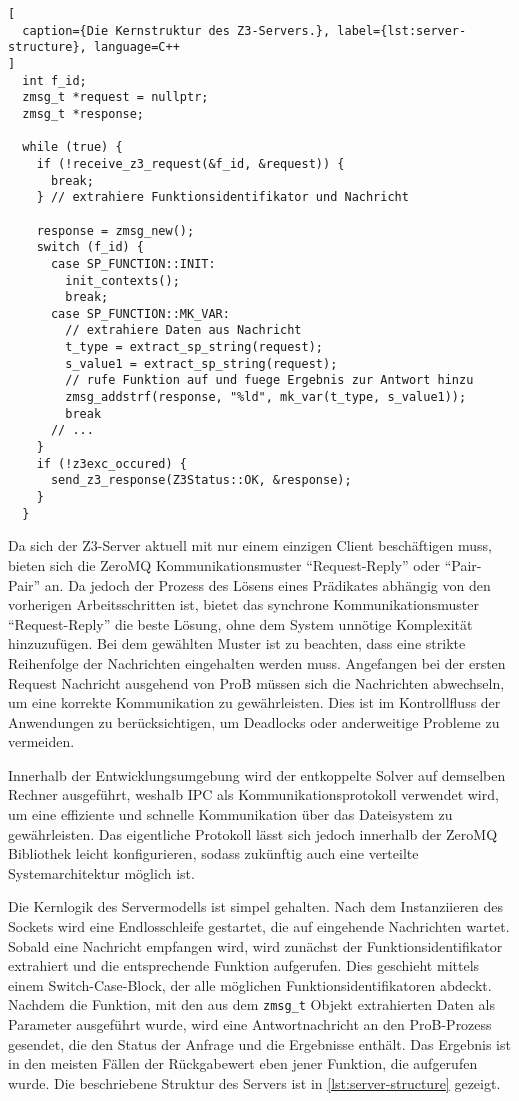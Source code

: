 \begin{lstlisting}[
  caption={Die Kernstruktur des Z3-Servers.}, label={lst:server-structure}, language=C++
]
  int f_id;
  zmsg_t *request = nullptr;
  zmsg_t *response;

  while (true) {
    if (!receive_z3_request(&f_id, &request)) {
      break;
    } // extrahiere Funktionsidentifikator und Nachricht

    response = zmsg_new();
    switch (f_id) {
      case SP_FUNCTION::INIT:
        init_contexts();
        break;
      case SP_FUNCTION::MK_VAR:
        // extrahiere Daten aus Nachricht
        t_type = extract_sp_string(request);
        s_value1 = extract_sp_string(request);
        // rufe Funktion auf und fuege Ergebnis zur Antwort hinzu
        zmsg_addstrf(response, "%ld", mk_var(t_type, s_value1));
        break
      // ...
    }
    if (!z3exc_occured) {
      send_z3_response(Z3Status::OK, &response);
    }
  }
\end{lstlisting}

Da sich der Z3-Server aktuell mit nur einem einzigen Client beschäftigen muss,
bieten sich die ZeroMQ Kommunikationsmuster \enquote{Request-Reply} oder \enquote{Pair-Pair} an.
Da jedoch der Prozess des Lösens eines Prädikates abhängig von den vorherigen Arbeitsschritten ist,
bietet das synchrone Kommunikationsmuster \enquote{Request-Reply} die beste Lösung, ohne dem System unnötige Komplexität hinzuzufügen.
Bei dem gewählten Muster ist zu beachten, dass eine strikte Reihenfolge der Nachrichten eingehalten werden muss.
Angefangen bei der ersten Request Nachricht ausgehend von ProB müssen sich die Nachrichten abwechseln, um eine korrekte Kommunikation zu gewährleisten.
Dies ist im Kontrollfluss der Anwendungen zu berücksichtigen, um Deadlocks oder anderweitige Probleme zu vermeiden.

Innerhalb der Entwicklungsumgebung wird der entkoppelte Solver auf demselben Rechner ausgeführt,
weshalb IPC als Kommunikationsprotokoll verwendet wird, um eine effiziente und schnelle Kommunikation über das Dateisystem zu gewährleisten.
Das eigentliche Protokoll lässt sich jedoch innerhalb der ZeroMQ Bibliothek leicht konfigurieren, sodass zukünftig auch eine verteilte Systemarchitektur möglich ist.

Die Kernlogik des Servermodells ist simpel gehalten.
Nach dem Instanziieren des Sockets wird eine Endlosschleife gestartet, die auf eingehende Nachrichten wartet.
Sobald eine Nachricht empfangen wird, wird zunächst der Funktionsidentifikator extrahiert und die entsprechende Funktion aufgerufen.
Dies geschieht mittels einem Switch-Case-Block, der alle möglichen Funktionsidentifikatoren abdeckt.
Nachdem die Funktion, mit den aus dem \texttt{zmsg\_t} Objekt extrahierten Daten als Parameter ausgeführt wurde,
wird eine Antwortnachricht an den ProB-Prozess gesendet, die den Status der Anfrage und die Ergebnisse enthält.
Das Ergebnis ist in den meisten Fällen der Rückgabewert eben jener Funktion, die aufgerufen wurde.
Die beschriebene Struktur des Servers ist in \cref{lst:server-structure} gezeigt.

